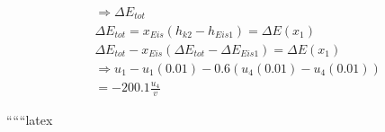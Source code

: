 \begin{align*}
& \Rightarrow \Delta E_{tot} \\
& \Delta E_{tot} = x_{Eis} \left( h_{k2} - h_{Eis1} \right) = \Delta E \left( x_1 \right) \\
& \Delta E_{tot} - x_{Eis} \left( \Delta E_{tot} - \Delta E_{Eis1} \right) = \Delta E \left( x_1 \right) \\
& \Rightarrow u_1 - u_1 \left( 0.01 \right) - 0.6 \left( u_4 \left( 0.01 \right) - u_4 \left( 0.01 \right) \right) \\
& = -200.1 \frac{u_4}{v}
\end{align*}

``````latex


